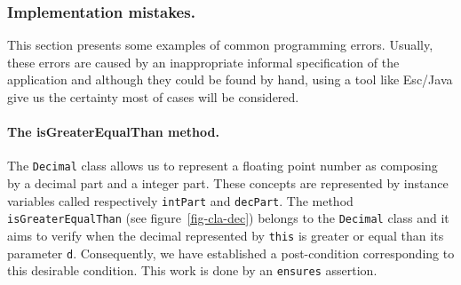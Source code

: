 \documentclass[a4paper]{llncs}
\begin{document}
\subsubsection{Implementation mistakes.}
This section presents some examples of common programming
errors. Usually, these errors are caused by an inappropriate informal
specification of the application and although they could be found by
hand, using a tool like Esc/Java give us the certainty most of cases
will be considered.


\paragraph{The isGreaterEqualThan method.}

The \texttt{Decimal} class allows us to
represent a floating point number as
composing by a decimal part and a integer part. These concepts are
represented by instance variables called respectively \texttt{intPart}
and \texttt{decPart}. The
method \texttt{isGreaterEqualThan} (see figure~\ref{fig-cla-dec})
belongs to the \texttt{Decimal} class and it aims to verify when the
decimal represented by \texttt{this} is greater or equal than its parameter
\texttt{d}. Consequently, we have established a post-condition
corresponding to this desirable condition. This work is done by an
\texttt{ensures} assertion.
\end{document}
